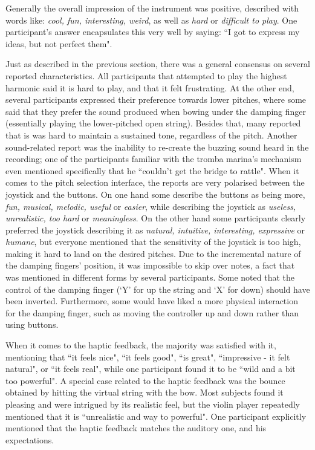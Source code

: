 Generally the overall impression of the instrument was positive, described with words like: \textit{cool, fun, interesting, weird}, as well as \textit{hard} or \textit{difficult to play}. One participant's answer encapsulates this very well by saying: ``I got to express my ideas, but not perfect them". 

Just as described in the previous section, there was a general consensus on several reported characteristics. All participants that attempted to play the highest harmonic said it is hard to play, and that it felt frustrating. At the other end, several participants expressed their preference towards lower pitches, where some said that they prefer the sound produced when bowing under the damping finger (essentially playing the lower-pitched open string). Besides that, many reported that is was hard to maintain a sustained tone, regardless of the pitch. Another sound-related report was the inability to re-create the buzzing sound heard in the recording; one of the participants familiar with the tromba marina's mechanism even mentioned specifically that he ``couldn't get the bridge to rattle". When it comes to the pitch selection interface, the reports are very polarised between the joystick and the buttons. On one hand some describe the buttons as being more, \textit{fun, musical, melodic, useful} or \textit{easier}, while describing the joystick as \textit{useless, unrealistic, too hard} or \textit{meaningless}. On the other hand some participants clearly preferred the joystick describing it as \textit{natural, intuitive, interesting, expressive} or \textit{humane}, but everyone mentioned that the sensitivity of the joystick is too high, making it hard to land on the desired pitches. Due to the incremental nature of the damping fingers' position, it was impossible to skip over notes, a fact that was mentioned in different forms by several participants. Some noted that the control of the damping finger (`Y' for up the string and `X' for down) should have been inverted. Furthermore, some would have liked a more physical interaction for the damping finger, such as moving the controller up and down rather than using buttons.

When it comes to the haptic feedback, the majority was satisfied with it, mentioning that ``it feels nice", ``it feels good", ``is great", ``impressive - it felt natural", or ``it feels real", while one participant found it to be ``wild and a bit too powerful". A special case related to the haptic feedback was the bounce obtained by hitting the virtual string with the bow. Most subjects found it pleasing and were intrigued by its realistic feel, but the violin player repeatedly mentioned that it is ``unrealistic and way to powerful". One participant explicitly mentioned that the haptic feedback matches the auditory one, and his expectations.

